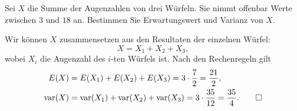 Sei $X$ die Summe der Augenzahlen von drei Würfeln.
Sie nimmt offenbar Werte zwischen $3$ und $18$ an. Bestimmen
Sie Erwartungswert und Varianz von $X$.


\begin{loesung}
Wir können $X$ zusammensetzen aus den Resultaten der einzelnen
Würfel:
\[
X=X_1+X_2+X_3,
\]
wobei $X_i$ die Augenzahl des $i$-ten Würfels ist.
Nach den Rechenregeln gilt
\begin{align*}
E(X)&=E(X_1)+E(X_2)+E(X_3)=3\cdot\frac72=\frac{21}{2},\\
\operatorname{var}(X)&=
\operatorname{var}(X_1)+
\operatorname{var}(X_2)+
\operatorname{var}(X_3)=3\cdot \frac{35}{12}=\frac{35}{4}.
\qedhere
\end{align*}
\end{loesung}

